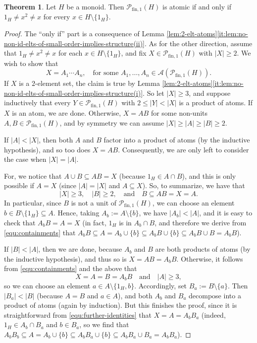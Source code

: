 \documentclass{report}
\renewcommand{\P}{\mathcal{P}}
\newcommand{\fin}{\textrm{fin}}
\newcommand{\fun}{{\textrm{fin}, 1}}
\renewcommand{\:}{\text{:}}
\theoremstyle{definition}
\newtheorem{thm}[defn]{Theorem}
\begin{document}
\begin{thm}\label{th:atomicity}
	Let $H$ be a monoid. Then $\mathcal P_\fun(H)$ is atomic if and only if $1_H \ne x^2 \ne x$ for every $x \in H \setminus \{1_H\}$.
\end{thm}
%
\begin{proof}
	The ``only if'' part is a consequence of Lemma \ref{lem:2-elt-atoms}\ref{it:lem:no-non-id-elts-of-small-order-implies-structure(ii)}.
	As for the other direction, assume that $1_H \ne x^2 \ne x$ for each $x\in H\setminus\{1_H\}$, and fix $X \in \mathcal P_{\fun}(H)$ with $|X| \ge 2$.
	We wish to show that 
	\[
	X = A_1 \cdots A_n, \quad\text{for some }A_1, \ldots, A_n \in \mathscr{A}(\mathcal P_{\fin,1}(H)).
	\]
	If $X$ is a $2$-element set, the claim is true by Lemma \ref{lem:2-elt-atoms}\ref{it:lem:no-non-id-elts-of-small-order-implies-structure(i)}. So let $|X| \ge 3$, and suppose inductively that every $Y \in \P_\fun(H)$ with $2 \le |Y| < |X|$ is a product of atoms. If $X$ is an atom, we are done.
	Otherwise, $X = A B$ for some non-units $A, B \in \P_\fun(H)$, and by symmetry we can assume $|X| \ge |A| \ge |B| \ge 2$. 
	
	If $|A| < |X|$, then both $A$ and $B$ factor into a product of atoms (by the inductive hypothesis), and so too does $X=A B$. Consequently, we are only left to consider the case when $|X| = |A|$. 
	
	For, we notice that 
	$
	A \cup B \subseteq A B = X 
	$
	(because $1_H \in A \cap B$), and this is only possible if $A = X$ (since $|A| = |X|$ and $A \subseteq X$). So, to summarize, we have that
	\begin{equation}\label{equ:containments}
	|X| \ge 3, \quad |B| \ge 2, \quad\text{and}\quad B \subseteq AB = X = A.
	\end{equation}
	In particular, since $B$ is not a unit of $\mathcal P_{\fin,1}(H)$, we can choose an element $b\in B\setminus\{1_H\} \subseteq A$. Hence, taking $A_b := A \setminus \{b\}$, we have $|A_b| < |A|$, and it is easy to check that $A_b B = A = X$ (in fact, $1_H$ is in $A_b \cap B$, and therefore we derive from \eqref{equ:containments} that $
	A_b B \subseteq A = A_b \cup \{b\} \subseteq A_b B \cup \{b\} \subseteq A_b B \cup B = A_b B$).
	
	If $|B|<|A|$, then we are done, because $A_b$ and $B$ are both products of atoms (by the inductive hypothesis), and thus so is $X = AB = A_bB$.
	Otherwise, it follows from \eqref{equ:containments} and the above that 
	\begin{equation}\label{equ:further-identities}
	X = A = B = A_b B \quad\text{and}\quad |A| \ge 3, 
	\end{equation}
	so we can choose an element $a \in A \setminus\{1_H,b\}$. Accordingly, set $B_a := B \setminus \{a\}$. Then $|B_a| < |B|$ (because $A = B$ and $a \in A$), and both $A_b$ and $B_a$ decompose into a product of atoms (again by induction). But this finishes the proof, since it is straightforward from \eqref{equ:further-identities} that $X = A = A_b B_a$ (indeed, $1_H \in A_b \cap B_a$ and $b \in B_a$, so we find that $
	A_b B_b \subseteq A = A_b \cup \{b\} \subseteq A_b B_a \cup \{b\} \subseteq A_b B_a \cup B_a = A_b B_a$).
\end{proof}
\end{document}
